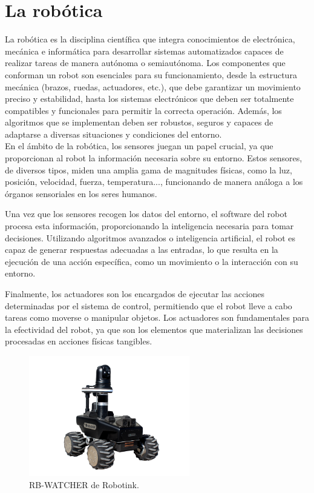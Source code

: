 \section{La robótica}
\label{sec:segundaseccion} %

La robótica es la disciplina científica que integra conocimientos de electrónica, mecánica e informática para desarrollar sistemas automatizados capaces de realizar tareas de manera autónoma o semiautónoma. Los componentes que conforman un robot son esenciales para su funcionamiento, desde la estructura mecánica (brazos, ruedas, actuadores, etc.), que debe garantizar un movimiento preciso y estabilidad, hasta los sistemas electrónicos que deben ser totalmente compatibles y funcionales para permitir la correcta operación. Además, los algoritmos que se implementan deben ser robustos, seguros y capaces de adaptarse a diversas situaciones y condiciones del entorno. \\

En el ámbito de la robótica, los sensores juegan un papel crucial, ya que proporcionan al robot la información necesaria sobre su entorno. Estos sensores, de diversos tipos, miden una amplia gama de magnitudes físicas, como la luz, posición, velocidad, fuerza, temperatura..., funcionando de manera análoga a los órganos sensoriales en los seres humanos. 

Una vez que los sensores recogen los datos del entorno, el software del robot procesa esta información, proporcionando la inteligencia necesaria para tomar decisiones. Utilizando algoritmos avanzados o inteligencia artificial, el robot es capaz de generar respuestas adecuadas a las entradas, lo que resulta en la ejecución de una acción específica, como un movimiento o la interacción con su entorno. 

Finalmente, los actuadores son los encargados de ejecutar las acciones determinadas por el sistema de control, permitiendo que el robot lleve a cabo tareas como moverse o manipular objetos. Los actuadores son fundamentales para la efectividad del robot, ya que son los elementos que materializan las decisiones procesadas en acciones físicas tangibles. 

\begin{figure} [h!]
  \begin{center}
    \includegraphics[width=7cm]{figs/Robot_intro}
  \end{center}
  \caption{\centering RB-WATCHER de Robotink.}
  \label{fig:Robot_intro}
\end{figure}

